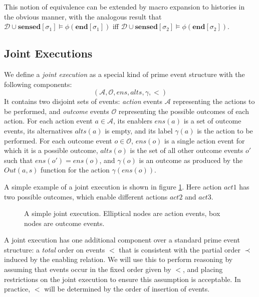 This notion of equivalence can be extended by macro expansion to histories
in the obvious manner, with the analogous result that $\mathcal{D}\cup\mathbf{sensed}[\sigma_{1}]\models\phi(\mathbf{end}[\sigma_{1}])$
iff $\mathcal{D}\cup\mathbf{sensed}[\sigma_{2}]\models\phi(\mathbf{end}[\sigma_{2}])$.


\subsection{Joint Executions}

We define a \emph{joint execution} as a special kind of prime event
structure with the following components:\[
(\mathcal{A},\mathcal{O},ens,alts,\gamma,<)\]
It contains two disjoint sets of events: \emph{action} events $\mathcal{A}$
representing the actions to be performed, and \emph{outcome} events
$\mathcal{O}$ representing the possible outcomes of each action.
For each action event $a\in\mathcal{A}$, its enablers $ens(a)$ is
a set of outcome events, its alternatives $alts(a)$ is empty, and
its label $\gamma(a)$ is the action to be performed. For each outcome
event $o\in\mathcal{O}$, $ens(o)$ is a single action event for which
it is a possible outcome, $alts(o)$ is the set of all other outcome
events $o'$ such that $ens(o')=ens(o)$, and $\gamma(o)$ is an outcome
as produced by the $Out(a,s)$ function for the action $\gamma(ens(o))$.

A simple example of a joint execution is shown in figure \ref{fig:example-je}.
Here action $act1$ has two possible outcomes, which enable different
actions $act2$ and $act3$.

%
\begin{figure}
%

\caption{
A simple joint execution. Elliptical nodes are action events, box
nodes are outcome events.
}
\label{fig:example-je}
\end{figure}


A joint execution has one additional component over a standard prime
event structure: a \emph{total }order on events $<$ that is consistent
with the partial order $\prec$ induced by the enabling relation.
We will use this to perform reasoning by assuming that events occur
in the fixed order given by $<$, and placing restrictions on the
joint execution to ensure this assumption is acceptable. In practice,
$<$ will be determined by the order of insertion of events.

